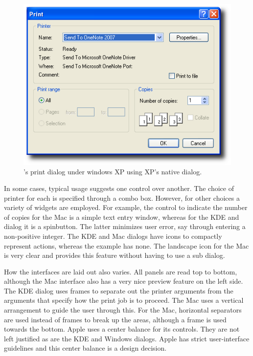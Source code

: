 \begin{figure}
  \centering
  \includegraphics[width=.80\textwidth]{r-print-dialog}
  \caption{\R's print dialog under windows XP using XP's native dialog.}
  \label{fig:GUI:print-dialogs-R}
\end{figure}

In some cases, typical usage suggests one control over another. The
choice of printer for each is specified through a combo box. However,
for other choices a variety of widgets are employed. For example, the
control to indicate the number of copies for the Mac is a simple text
entry window, whereas for the KDE and \R\/ dialog it
is a spinbutton. The latter minimizes user error, say through entering
a non-positive integer. The KDE and Mac dialogs have icons to
compactly represent actions, whereas the \R\/ example has none. The
landscape icon for the Mac is very clear and provides this feature
without having to use a sub dialog.


How the interfaces are laid out also varies.  All
panels are read top to bottom, although the Mac interface also has a very
nice preview feature on the left side. The KDE dialog uses frames to
separate out the printer arguments from the arguments that specify how
the print job is to proceed. The Mac uses a vertical arrangement to
guide the user through this. For the Mac, horizontal separators are
used instead of frames to break up the areas, although a frame is used
towards the bottom. Apple uses a center balance for its controls. They
are not left justified as are the KDE and Windows dialogs. Apple has
strict user-interface guidelines and this center balance is a design
decision.

